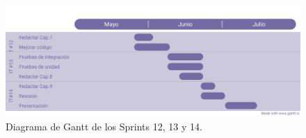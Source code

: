 \begin{figure}[H]
    \centering
    \centerline{\includegraphics[width=1.2\textwidth]{imagenes/c4/gantt4.png}}
    \caption{Diagrama de Gantt de los Sprints 12, 13 y 14.}
    \label{fig:diagrama_gantt4}
\end{figure}

